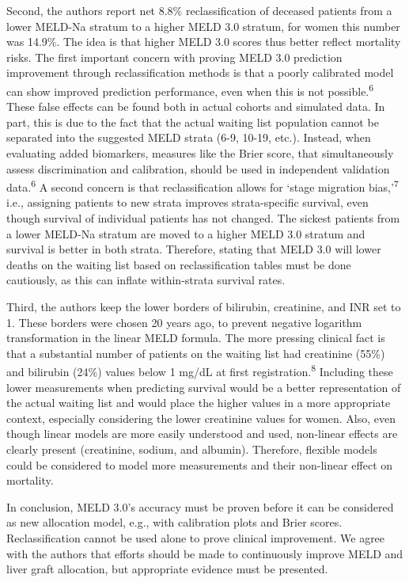 \documentclass[11pt,english,]{book} %
\begin{document}
Second, the authors report net 8.8\% reclassification of deceased patients from a lower MELD-Na stratum to a higher MELD 3.0 stratum, for women this number was 14.9\%. The idea is that higher MELD 3.0 scores thus better reflect mortality risks. The first important concern with proving MELD 3.0 prediction improvement through reclassification methods is that a poorly calibrated model can show improved prediction performance, even when this is not possible.\textsuperscript{6} These false effects can be found both in actual cohorts and simulated data. In part, this is due to the fact that the actual waiting list population cannot be separated into the suggested MELD strata (6-9, 10-19, etc.). Instead, when evaluating added biomarkers, measures like the Brier score, that simultaneously assess discrimination and calibration, should be used in independent validation data.\textsuperscript{6}
A second concern is that reclassification allows for `stage migration bias,'\textsuperscript{7} i.e., assigning patients to new strata improves strata-specific survival, even though survival of individual patients has not changed. The sickest patients from a lower MELD-Na stratum are moved to a higher MELD 3.0 stratum and survival is better in both strata. Therefore, stating that MELD 3.0 will lower deaths on the waiting list based on reclassification tables must be done cautiously, as this can inflate within-strata survival rates.

Third, the authors keep the lower borders of bilirubin, creatinine, and INR set to 1. These borders were chosen 20 years ago, to prevent negative logarithm transformation in the linear MELD formula. The more pressing clinical fact is that a substantial number of patients on the waiting list had creatinine (55\%) and bilirubin (24\%) values below 1 mg/dL at first registration.\textsuperscript{8} Including these lower measurements when predicting survival would be a better representation of the actual waiting list and would place the higher values in a more appropriate context, especially considering the lower creatinine values for women. Also, even though linear models are more easily understood and used, non-linear effects are clearly present (creatinine, sodium, and albumin). Therefore, flexible models could be considered to model more measurements and their non-linear effect on mortality.

In conclusion, MELD 3.0's accuracy must be proven before it can be considered as new allocation model, e.g., with calibration plots and Brier scores. Reclassification cannot be used alone to prove clinical improvement. We agree with the authors that efforts should be made to continuously improve MELD and liver graft allocation, but appropriate evidence must be presented.
\end{document}

